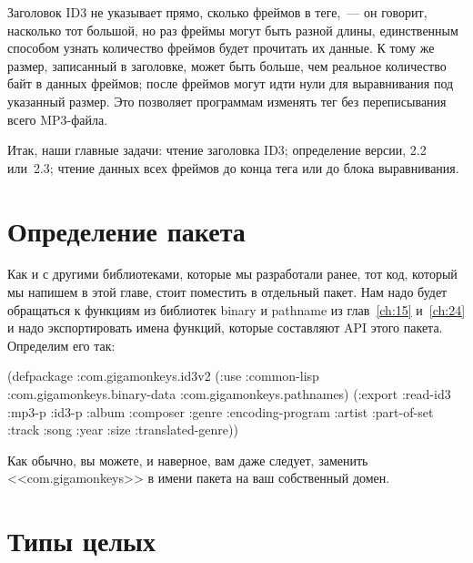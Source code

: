 Заголовок ID3 не указывает прямо, сколько фреймов в теге,~--- он говорит, насколько тот
большой, но раз фреймы могут быть разной длины, единственным способом узнать количество
фреймов будет прочитать их данные.  К тому же размер, записанный в заголовке, может быть
больше, чем реальное количество байт в данных фреймов; после фреймов могут идти нули для
выравнивания под указанный размер.  Это позволяет программам изменять тег без
переписывания всего MP3-файла.

Итак, наши главные задачи: чтение заголовка ID3; определение версии, 2.2 или~2.3; чтение
данных всех фреймов до конца тега или до блока выравнивания.

\section{Определение пакета}

Как и с другими библиотеками, которые мы разработали ранее, тот код, который мы напишем в
этой главе, стоит поместить в отдельный пакет.  Нам надо будет обращаться к функциям
из библиотек binary и pathname из глав~\ref{ch:15} и~\ref{ch:24} и надо экспортировать
имена функций, которые составляют API этого пакета.  Определим его так:

\begin{myverb}
(defpackage :com.gigamonkeys.id3v2
  (:use :common-lisp
        :com.gigamonkeys.binary-data
        :com.gigamonkeys.pathnames)
  (:export
   :read-id3
   :mp3-p
   :id3-p
   :album
   :composer
   :genre
   :encoding-program
   :artist
   :part-of-set
   :track
   :song
   :year
   :size
   :translated-genre))
\end{myverb}

Как обычно, вы можете, и наверное, вам даже следует, заменить <<com.gigamonkeys>> в имени
пакета на ваш собственный домен.

\section{Типы целых}

